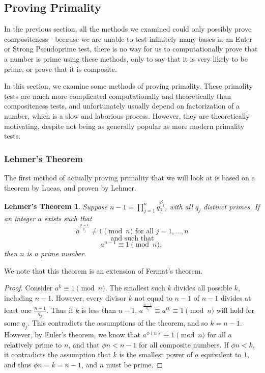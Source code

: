 \documentclass{article}
\begin{document}
\subsection{Proving Primality}

\par In the previous section, all the methods we examined could only possibly prove compositeness - because we are unable to test
infinitely many bases in an Euler or Strong Pseudoprime test, there is no way for us to computationally prove that a number is prime using
these methods, only to say that it is very likely to be prime, or prove that it is composite. 
\par In this section, we examine some methods of proving primality. These primality tests are much more complicated computationally and theoretically than compositeness tests, and unfortunately usually depend on factorization of a number, which is a slow and laborious 
process. However, they are theoretically motivating, despite not being as generally popular as more modern primality tests.

\subsubsection{Lehmer's Theorem}

\par The first method of actually proving primality that we will look at is based on a theorem by Lucas, and proven by Lehmer.

\newtheorem*{lehmer}{Lehmer's Theorem}
\begin{lehmer}
Suppose $n-1 = \prod^n_{j=1} q_j^{\beta_j}$, with all $q_j$ distinct primes. If an integer $a$ exists such that 
	$$a^\frac{n-1}{q_j} \neq 1 \pmod n \text{ for all } j = 1, \ldots, n$$
	$$\text { and such that }$$
	$$a^{n-1} \equiv 1\pmod n \text{, }$$
then $n$ is a prime number.
\end{lehmer}
We note that this theorem is an extension of Fermat's theorem. 
\begin{proof}
Consider $a^k \equiv 1 \pmod n$. The smallest such $k$ divides all possible $k$, including $n-1$. However, every divisor $k$ not equal to $n-1$ of $n-1$ divides at least one $\frac{n-1}{q_j}$. Thus if $k$ is  less than $n-1$,  $a^{\frac{n-1}{q_j}} \equiv a^{tk}\equiv 1 \pmod n$ will hold for some $q_j$. This contradicts the assumptions of the theorem, and so $k = n-1$. However, by Euler's theorem, we know that $a^{\phi(n)} \equiv 1 \pmod n$ for all $a$ relatively prime to $n$, and that $\phi{n} < n-1$ for all composite numbers. If $\phi{n} < k$, it contradicts the assumption that $k$ is the smallest power of $a$ equivalent to $1$, and thus $\phi{n} = k = n-1$, and $n$ must be prime.
\end{proof}
\end{document}

